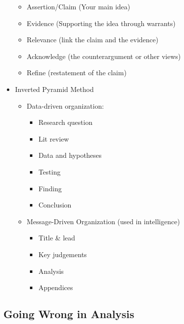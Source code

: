 \documentclass[11pt]{article}
\begin{document}
\begin{itemize}
\begin{itemize}
\item Assertion/Claim (Your main idea)
\item Evidence (Supporting the idea through warrants)
\item Relevance (link the claim and the evidence)
\item Acknowledge (the counterargument or other views)
\item Refine (restatement of the claim)
\end{itemize}
\item Inverted Pyramid Method
\begin{itemize}
\item Data-driven organization:
\begin{itemize}
\item Research question
\item Lit review
\item Data and hypotheses
\item Testing
\item Finding
\item Conclusion
\end{itemize}
\item Message-Driven Organization (used in intelligence)
\begin{itemize}
\item Title \& lead
\item Key judgements
\item Analysis
\item Appendices
\end{itemize}
\end{itemize}
\end{itemize}
\subsection{Going Wrong in Analysis}
\label{sec:org7e571b3}
\end{document}
